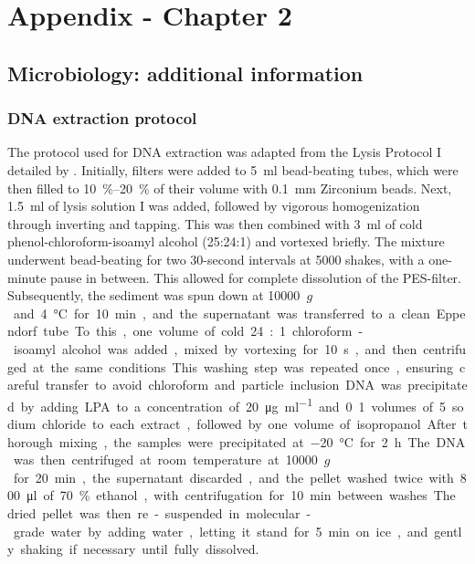 \chapter{Appendix - Chapter 2}
\label{ch:appendix_ch2}

\section{Microbiology: additional information}
\subsection{DNA extraction protocol}
The protocol used for DNA extraction was adapted from the Lysis Protocol I detailed by \citep{lever2015modular}.
Initially, filters were added to \SI{5}{\milli\litre} bead-beating tubes, which were then filled to \SIrange{10}{20}{\percent} of their volume with \SI{0.1}{\milli\metre} Zirconium beads.
Next, \SI{1.5}{\milli\litre} of lysis solution I was added, followed by vigorous homogenization through inverting and tapping.
This was then combined with \SI{3}{\milli\litre} of cold phenol-chloroform-isoamyl alcohol (25:24:1) and vortexed briefly.
The mixture underwent bead-beating for two 30-second intervals at 5000 shakes, with a one-minute pause in between.
This allowed for complete dissolution of the PES-filter.
Subsequently, the sediment was spun down at \SI{10000}{\times $g$} and \SI{4}{\celsius} for \SI{10}{\minute}, and the supernatant was transferred to a clean Eppendorf tube.
To this, one volume of cold 24:1 chloroform-isoamyl alcohol was added, mixed by vortexing for \SI{10}{\second}, and then centrifuged at the same conditions.
This washing step was repeated once, ensuring careful transfer to avoid chloroform and particle inclusion.
DNA was precipitated by adding LPA to a concentration of \SI{20}{\micro\gram\per\milli\litre} and 0.1 volumes of \SI{5}{\molar} sodium chloride to each extract, followed by one volume of isopropanol.
After thorough mixing, the samples were precipitated at \SI{-20}{\celsius} for \SI{2}{\hour}.
The DNA was then centrifuged at room temperature at \SI{10000}{\times $g$} for \SI{20}{\minute}, the supernatant discarded, and the pellet washed twice with \SI{800}{\micro\litre} of \SI{70}{\percent} ethanol, with centrifugation for \SI{10}{\minute} between washes.
The dried pellet was then re-suspended in molecular-grade water by adding water, letting it stand for \SI{5}{\minute} on ice, and gently shaking if necessary until fully dissolved.

